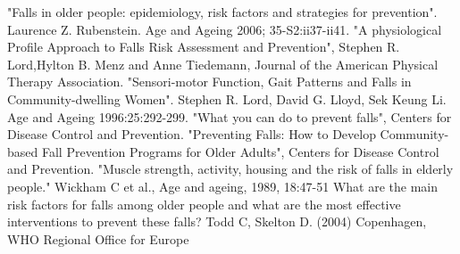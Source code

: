 \begin{thebibliography}{99}
"Falls in older people: epidemiology, risk factors and strategies for prevention". Laurence Z. Rubenstein. Age and Ageing 2006; 35-S2:ii37-ii41.
"A physiological Profile Approach to Falls Risk Assessment and Prevention", Stephen R. Lord,Hylton B. Menz and Anne Tiedemann, Journal of the American Physical Therapy Association. 
"Sensori-motor Function, Gait Patterns and Falls in Community-dwelling Women". Stephen R. Lord, David G. Lloyd, Sek Keung Li. Age and Ageing 1996:25:292-299.
	"What you can do to prevent falls", Centers for Disease Control and Prevention.
"Preventing Falls: How to Develop Community-based Fall Prevention Programs for Older Adults", Centers for Disease Control and Prevention.
"Muscle strength, activity, housing and the risk of falls in elderly people." Wickham C et al., Age and ageing, 1989, 18:47-51 
What are the main risk factors for falls among older people and what are the most effective interventions to prevent these falls? Todd C, Skelton D. (2004) Copenhagen, WHO Regional Office for Europe 
 
\end{thebibliography}